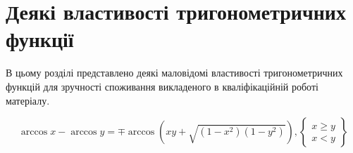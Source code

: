 \chapter{Деякі властивості тригонометричних функції}
\label{ch:trigonometric}

В цьому розділі представлено деякі маловідомі властивості тригонометричних 
функцій для зручності споживання викладеного в кваліфікаційній роботі 
матеріалу.

%
\begin{equation}
\arccos x - \arccos y = \mp \arccos \left( 
xy + \sqrt{(1-x^2)(1-y^2)} \right),
\left\{ \begin{array}{c} x \ge y \\ x < y  \end{array} \right\}
\end{equation}
